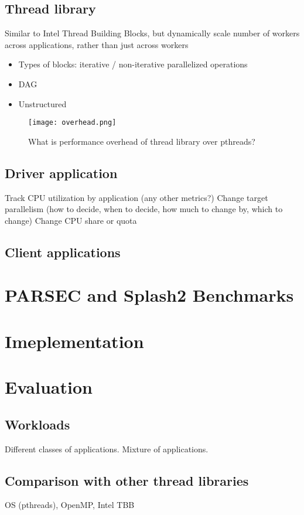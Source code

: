 \documentclass[10pt,preprint]{sigplanconf}
\begin{document}
\subsection{Thread library}
Similar to Intel Thread Building Blocks, but dynamically scale number of workers across applications, rather than just across workers
\begin{itemize}
  \item Types of blocks: iterative / non-iterative parallelized operations
  \item DAG
  \item Unstructured
\end{itemize}

\begin{figure}
\centering
  \texttt{[image: overhead.png]}
  \caption{What is performance overhead of thread library over pthreads?}
\end{figure}
\subsection{Driver application}
Track CPU utilization by application (any other metrics?)
Change target parallelism (how to decide, when to decide, how much to change by, which to change)
Change CPU share or quota
\subsection{Client applications}

\section{PARSEC and Splash2 Benchmarks}

\section{Imeplementation}

\section{Evaluation}
\subsection{Workloads}
Different classes of applications. Mixture of applications.

\subsection{Comparison with other thread libraries}
OS (pthreads), OpenMP, Intel TBB
\end{document}
